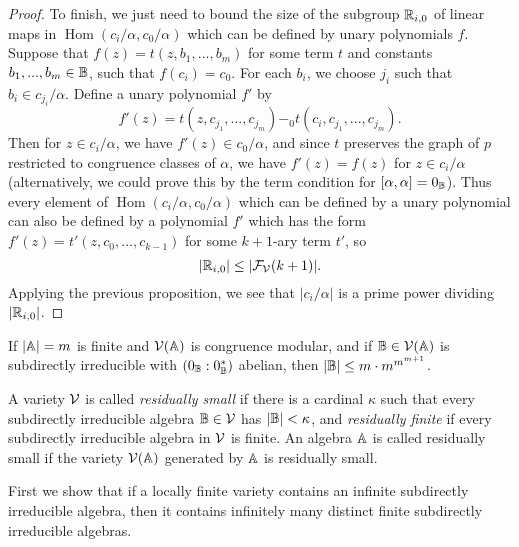 \documentclass[letterpaper,11pt]{article}
\DeclareMathOperator{\Hom}{Hom}
\begin{document}
\begin{proof}
To finish, we just need to bound the size of the subgroup $\mathbb{R}_{i,0}$ of linear maps in $\Hom(c_i/\alpha, c_0/\alpha)$ which can be defined by unary polynomials $f$. Suppose that $f(z) = t(z,b_1, ..., b_m)$ for some term $t$ and constants $b_1, ..., b_m \in \mathbb{B}$, such that $f(c_i) = c_0$. For each $b_i$, we choose $j_i$ such that $b_i \in c_{j_i}/\alpha$. Define a unary polynomial $f'$ by
\[
f'(z) = t(z,c_{j_1}, ..., c_{j_m}) -_0 t(c_i, c_{j_1}, ..., c_{j_m}).
\]
Then for $z \in c_i/\alpha$, we have $f'(z) \in c_0/\alpha$, and since $t$ preserves the graph of $p$ restricted to congruence classes of $\alpha$, we have $f'(z) = f(z)$ for $z \in c_i/\alpha$ (alternatively, we could prove this by the term condition for $[\alpha,\alpha] = 0_{\mathbb{B}}$). Thus every element of $\Hom(c_i/\alpha,c_0/\alpha)$ which can be defined by a unary polynomial can also be defined by a polynomial $f'$ which has the form $f'(z) = t'(z,c_0,...,c_{k-1})$ for some $k+1$-ary term $t'$, so
\[
|\mathbb{R}_{i,0}| \le |\mathcal{F}_{\mathcal{V}}(k+1)|.
\]
Applying the previous proposition, we see that $|c_i/\alpha|$ is a prime power dividing $|\mathbb{R}_{i,0}|$.
\end{proof}

\begin{cor}\label{subdirect-bound-ab} If $|\mathbb{A}| = m$ is finite and $\mathcal{V}(\mathbb{A})$ is congruence modular, and if $\mathbb{B} \in \mathcal{V}(\mathbb{A})$ is subdirectly irreducible with $(0_{\mathbb{B}}:0_{\mathbb{B}}^*)$ abelian, then $|\mathbb{B}| \le m\cdot m^{m^{m+1}}$.
\end{cor}

\begin{defn} A variety $\mathcal{V}$ is called \emph{residually small} if there is a cardinal $\kappa$ such that every subdirectly irreducible algebra $\mathbb{B} \in \mathcal{V}$ has $|\mathbb{B}| < \kappa$, and \emph{residually finite} if every subdirectly irreducible algebra in $\mathcal{V}$ is finite. An algebra $\mathbb{A}$ is called residually small if the variety $\mathcal{V}(\mathbb{A})$ generated by $\mathbb{A}$ is residually small.
\end{defn}

First we show that if a locally finite variety contains an infinite subdirectly irreducible algebra, then it contains infinitely many distinct finite subdirectly irreducible algebras.
\end{document}

